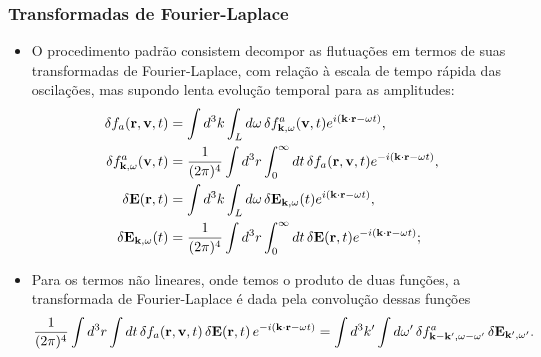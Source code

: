 \documentclass[10pt,aspectratio=1610,lualatex]{beamer}
\begin{document}
\begin{frame}
  \frametitle{Transformadas de Fourier-Laplace}
  \begin{itemize}
    \item O procedimento padrão consistem decompor as flutuações
    em termos de suas transformadas de Fourier-Laplace, com relação
    à escala de tempo rápida das oscilações, mas supondo lenta evolução
    temporal para as amplitudes:
    \begin{equation*}
      \begin{split}
	\delta f_a({\bf r}, {\bf v},t)
	&=\int d^3k \int_L d \omega\,\delta f^a_{{\bf k}, \omega}({\bf v}, t)
	e^{i({\bf k \cdot r}-\omega t)},\\
	\delta f^a_{{\bf k}, \omega}({\bf v}, t)
	&=\frac{1}{(2 \pi)^4}\int d^3r \int_0^{\infty} dt\,
	\delta f_a({\bf r},{\bf v},t) e^{-i({\bf k \cdot r} - \omega t)},\\
	\delta {\bf E}({\bf r},t)
	&=\int d^3k \int_L d\omega\, \delta{\bf E}_{{\bf k},\omega}(t)
	e^{i({\bf k \cdot r}-\omega t)},\\
	\delta{\bf E}_{{\bf k},\omega}(t)
	&=\frac{1}{(2 \pi)^4}\int d^3r\int_0^{\infty} dt\,
	\delta{\bf  E}({\bf   r},t) e^{-i({\bf k \cdot r} - \omega t)};
      \end{split}
    \end{equation*}
    \item Para os termos não lineares, onde temos o produto de duas
    funções, a transformada de Fourier-Laplace é dada pela convolução
    dessas funções
    \begin{equation*}
      \frac{1}{(2\pi)^4}\int d^3r \int dt\,
      \delta f_a({\bf r}, {\bf v},t)\,
      \delta{\bf E}({\bf r},t)\, e^{-i({\bf k \cdot r}-\omega t)}
      =\int d^3k' \int d\omega '\,\delta f^a_{{\bf k-k'},\omega-\omega '}\,
      \delta{\bf E}_{{\bf k'},\omega '}.
    \end{equation*}
  \end{itemize}
\end{frame}
\end{document}
